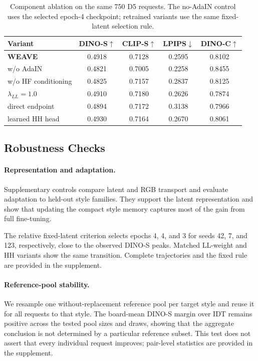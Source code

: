 \documentclass[letterpaper]{article}
\begin{document}
\begin{table}[t]
\centering
\footnotesize
\setlength{\tabcolsep}{4pt}
\begin{tabular}{@{}lcccc@{}}
\toprule
Variant & DINO-S$\uparrow$ & CLIP-S$\uparrow$ & LPIPS$\downarrow$ & DINO-C$\uparrow$ \\
\midrule
\textbf{WEAVE} & 0.4918 & 0.7128 & 0.2595 & 0.8102 \\
w/o AdaIN & 0.4821 & 0.7005 & 0.2258 & 0.8455 \\
w/o HF conditioning & 0.4825 & 0.7157 & 0.2837 & 0.8125 \\
$\lambda_{LL}{=}1.0$ & 0.4910 & 0.7180 & 0.2626 & 0.7874 \\
direct endpoint & 0.4894 & 0.7172 & 0.3138 & 0.7966 \\
learned HH head & 0.4930 & 0.7164 & 0.2670 & 0.8061 \\
\bottomrule
\end{tabular}
\caption{Component ablation on the same 750 D5 requests. The no-AdaIN control uses the
selected epoch-4 checkpoint; retrained variants use the same fixed-latent selection rule.}
\label{tab:ablation}
\end{table}









\subsection{Robustness Checks}
\label{sec:gen}

\paragraph{Representation and adaptation.}
Supplementary controls compare latent and RGB transport and evaluate adaptation to held-out
style families. They support the latent representation and show that updating the compact
style memory captures most of the gain from full fine-tuning.

The relative fixed-latent criterion selects epochs 4, 4, and 3 for seeds 42, 7, and 123,
respectively, close to the observed DINO-S peaks. Matched LL-weight and HH variants show
the same transition. Complete trajectories and the fixed rule are provided in the supplement.

\paragraph{Reference-pool stability.}
We resample one without-replacement reference pool per target style and reuse it for all
requests to that style. The board-mean DINO-S margin over IDT remains positive across the
tested pool sizes and draws, showing that the aggregate conclusion is not determined by a
particular reference subset. This test does not assert that every individual request
improves; pair-level statistics are provided in the supplement.
\end{document}
